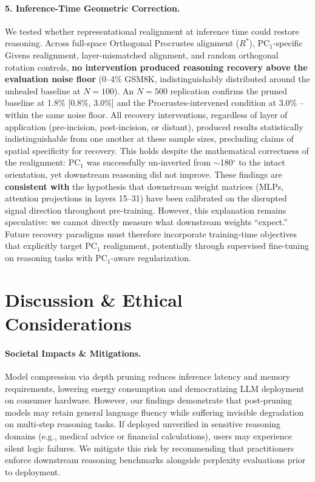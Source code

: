\documentclass[11pt]{article}
\begin{document}
\paragraph{5. Inference-Time Geometric Correction.}
We tested whether representational realignment at inference time could restore reasoning. Across full-space Orthogonal Procrustes alignment ($R^*$), PC$_1$-specific Givens realignment, layer-mismatched alignment, and random orthogonal rotation controls, \textbf{no intervention produced reasoning recovery above the evaluation noise floor} (0--4\% GSM8K, indistinguishably distributed around the unhealed baseline at $N=100$). An $N=500$ replication confirms the pruned baseline at 1.8\% [0.8\%, 3.0\%] and the Procrustes-intervened condition at 3.0\% -- within the same noise floor. All recovery interventions, regardless of layer of application (pre-incision, post-incision, or distant), produced results statistically indistinguishable from one another at these sample sizes, precluding claims of spatial specificity for recovery. This holds despite the mathematical correctness of the realignment: PC$_1$ was successfully un-inverted from $\sim$180$^\circ$ to the intact orientation, yet downstream reasoning did not improve. These findings are \textbf{consistent with} the hypothesis that downstream weight matrices (MLPs, attention projections in layers 15--31) have been calibrated on the disrupted signal direction throughout pre-training. However, this explanation remains speculative: we cannot directly measure what downstream weights ``expect.'' Future recovery paradigms must therefore incorporate training-time objectives that explicitly target PC$_1$ realignment, potentially through supervised fine-tuning on reasoning tasks with PC$_1$-aware regularization.

\section{Discussion \& Ethical Considerations}

\paragraph{Societal Impacts \& Mitigations.}
Model compression via depth pruning reduces inference latency and memory requirements, lowering energy consumption and democratizing LLM deployment on consumer hardware. However, our findings demonstrate that post-pruning models may retain general language fluency while suffering invisible degradation on multi-step reasoning tasks. If deployed unverified in sensitive reasoning domains (e.g., medical advice or financial calculations), users may experience silent logic failures. We mitigate this risk by recommending that practitioners enforce downstream reasoning benchmarks alongside perplexity evaluations prior to deployment.
\end{document}

